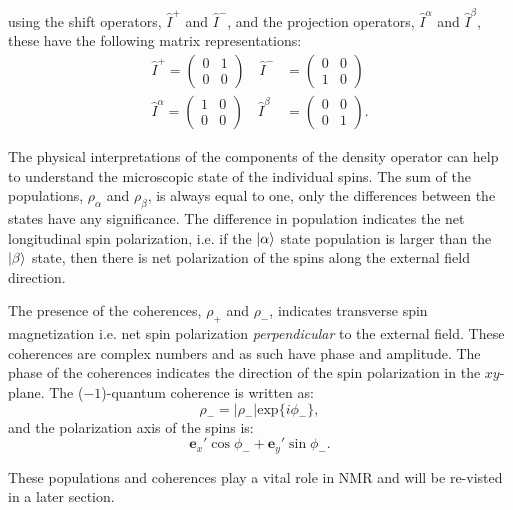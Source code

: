 using the shift operators, $\hat{I}^+$ and $\hat{I}^-$, and the projection operators, $\hat{I}^\alpha$ and $\hat{I}^\beta$, these have the following matrix representations:
\begin{align*}
  \hat{I}^+ = \begin{pmatrix}
    0 & 1\\
    0 & 0
\end{pmatrix}\quad\hat{I}^- &= \begin{pmatrix}
  0 & 0\\
  1 & 0
\end{pmatrix}\\
\hat{I}^\alpha = \begin{pmatrix}
  1 & 0\\
  0 & 0
\end{pmatrix}\quad\hat{I}^\beta &= \begin{pmatrix}
  0 & 0\\
  0 & 1
\end{pmatrix}.
\end{align*}

The physical interpretations of the components of the density operator can help to understand the microscopic state
of the individual spins. The sum of the populations, $\rho_\alpha$ and $\rho_\beta$, is always equal to one, only the differences between the states
have any significance. The difference in population indicates the net longitudinal spin polarization, i.e. if the
$\ket{\alpha}$ state population is larger than the $\ket{\beta}$ state, then there is net polarization of the spins
along the external field direction.

The presence of the coherences, $\rho_+$ and $\rho_-$, indicates transverse spin magnetization i.e. net spin
polarization \textit{perpendicular} to the external field. These coherences are complex numbers and as
such have phase and amplitude. The phase of the coherences indicates the direction of the spin polarization
in the $xy$-plane. The ($-1$)-quantum coherence is written as:
\begin{equation}
  \rho_-= |\rho_-|\text{exp}\{i\phi_-\},
\end{equation}
and the polarization  axis of the spins is:
\begin{equation}
  \mathbf{e}_x'\cos\phi_- + \mathbf{e}_y'\sin\phi_-.
\end{equation}

These populations and coherences play a vital role in NMR and will be re-visted in a later section.

